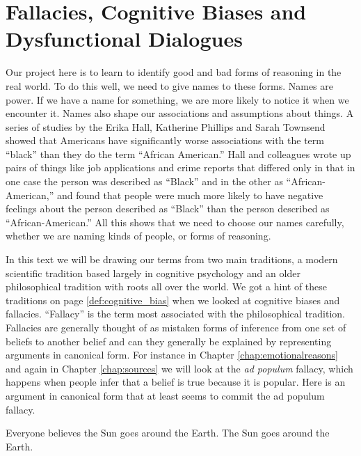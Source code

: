 

\section{Fallacies, Cognitive Biases and Dysfunctional Dialogues}

Our project here is to learn to identify good and bad forms of reasoning in the real world. To do this well, we need to give names to these forms. Names are power. If we have a name for something, we are more likely to notice it when we encounter it.  Names also shape our associations and assumptions about things. A series of studies by the Erika Hall, Katherine Phillips and Sarah Townsend showed that Americans have significantly worse associations with the term ``black'' than they do the term ``African American.'' \citep{ErikaV.Hall2015} Hall and colleagues wrote up pairs of things like job applications and crime reports that differed only in that in one case the person was described as ``Black'' and in the other as ``African-American,'' and found that people were much more likely to have negative feelings about the person described as ``Black'' than the person described as ``African-American.'' All this shows that we need to choose our names carefully, whether we are naming kinds of people, or forms of reasoning. 

In this text we will be drawing our terms from two main traditions, a modern scientific tradition based largely in cognitive psychology and an older philosophical tradition with roots all over the world. We got a hint of these traditions on page \ref{def:cognitive_bias} when we looked at cognitive biases and fallacies. ``Fallacy'' is the term most associated with the philosophical tradition. Fallacies are generally thought of as mistaken forms of inference from one set of beliefs to another belief and can they generally be explained by representing arguments in canonical form. \label{fallacy_detail} For instance in Chapter \ref{chap:emotionalreasons} and again in Chapter \ref{chap:sources} we will look at the \emph{ad populum} fallacy, which happens when people infer that a belief is true because it is popular. Here is an argument in canonical form that at least seems to commit the ad populum fallacy.

\begin{earg*}
\item Everyone believes the Sun goes around the Earth.
\itemc The Sun goes around the Earth.
\end{earg*}

